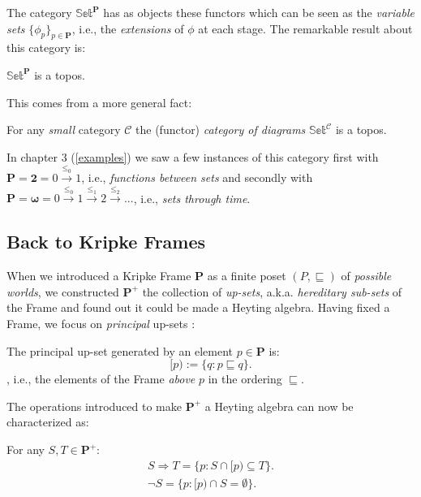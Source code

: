 The category $\mathbb{Set}^\textbf{P}$ has as objects these functors which can be seen as the \emph{variable sets} $\{ \phi_p \}_{p \in \textbf{P}}$, i.e., the \emph{extensions} of $\phi$ at each stage.
\newline
The remarkable result about this category is:
\begin{prop}
	$\mathbb{Set}^\textbf{P}$  is a topos. 
\end{prop}
	This comes from a more general fact:
	\begin{thm}
		For any \emph{small} category $\mathcal{C}$ the (functor) \emph{category of diagrams} $\mathbb{Set}^\mathcal{C}$ is a topos. 
	\end{thm}
	

	In chapter 3 (\ref{examples}) we saw a few instances of this category first with $\textbf{P}= \mathbf{2} = 0 \xrightarrow{\leq_0} 1$, i.e., \emph{functions between sets} and secondly with $\textbf{P}= \mathbf{\omega} = 0 \xrightarrow{\leq_0} 1 \xrightarrow{\leq_1} 2 \xrightarrow{\leq_2}...$, i.e., \emph{sets through time}.



\newpage
\subsection{Back to Kripke Frames}

When we introduced a Kripke Frame $\textbf{P}$ as a finite poset $(P, \sqsubseteq)$ of \emph{possible worlds}, we constructed $\textbf{P}^+$ the collection of \emph{up-sets}, a.k.a. \emph{hereditary sub-sets} of the Frame and found out it could be made a Heyting algebra. \newline
Having fixed a Frame, we focus on \emph{principal} up-sets :

\begin{definition}
	The principal up-set generated by an element $p \in \textbf{P}$ is:
	\begin{equation*}
		[p) := \{q : p \sqsubseteq q\}.
	\end{equation*}
	, i.e., the elements of the Frame \emph{above} $p$ in the ordering $\sqsubseteq$.
\end{definition}

The operations introduced to make  $\textbf{P}^+$ a Heyting algebra can now be characterized as:

\begin{lem} For any $S,T \in \textbf{P}^+$:
	\begin{gather*}
		S \Rightarrow T = \{p : S \cap [p) \subseteq T\}. \\
		\neg S = \{p: [p) \cap S = \emptyset\}.
	\end{gather*}
\end{lem}

